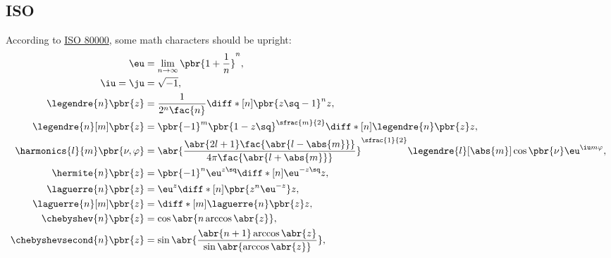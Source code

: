 \subsection{ISO}

According to \href{https://webusers.imj-prg.fr/~jean-yves.ducloux/Typographie/ISO80000-2.pdf}{ISO 80000}, some math characters should be upright:
\begin{align*}
  \eu                                &= \lim_{n\to\infty}\pbr{1 + \frac{1}{n}}^n,                                                                                                           \\
  \iu = \ju                          &= \sqrt{-1},                                                                                                                                          \\
  \legendre{n}\pbr{z}                &= \frac{1}{2^n\fac{n}}\diff*[n]{\pbr{z\sq - 1}^n}{z},                                                                                                 \\
  \legendre{n}[m]\pbr{z}             &= \pbr{-1}^m \pbr{1 - z\sq}^{\sfrac{m}{2}} \diff*[n]{\legendre{n}\pbr{z}}{z},                                                                         \\
  \harmonics{l}{m}\pbr{\nu, \varphi} &= \abr{\frac{\abr{2l + 1}\fac{\abr{l - \abs{m}}}}{4\pi\fac{\abr{l + \abs{m}}}}}^{\sfrac{1}{2}} \legendre{l}[\abs{m}] \cos\pbr{\nu}\eu^{\iu m\varphi}, \\
  \hermite{n}\pbr{z}                 &= \pbr{-1}^n \eu^{z\sq} \diff*[n]{\eu^{-z\sq}}{z},                                                                                                    \\
  \laguerre{n}\pbr{z}                &= \eu^z \diff*[n]{\pbr{z^n \eu^{-z}}}{z},                                                                                                             \\
  \laguerre{n}[m]\pbr{z}             &= \diff*[m]{\laguerre{n}\pbr{z}}{z},                                                                                                                  \\
  \chebyshev{n}\pbr{z}               &= \cos\abr{n\arccos\abr{z}},                                                                                                                          \\
  \chebyshevsecond{n}\pbr{z}         &= \sin\abr{\frac{\abr{n + 1}\arccos\abr{z}}{\sin\abr{\arccos\abr{z}}}},                                                                               \\

\end{align*}
